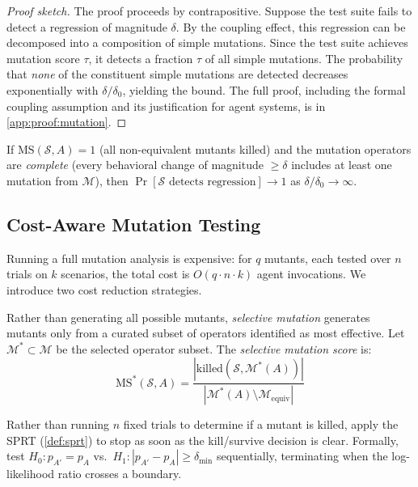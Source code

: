 \begin{proof}[Proof sketch]
The proof proceeds by contrapositive. Suppose the test suite fails to
detect a regression of magnitude $\delta$. By the coupling effect, this
regression can be decomposed into a composition of simple mutations.
Since the test suite achieves mutation score $\tau$, it detects a
fraction $\tau$ of all simple mutations. The probability that \emph{none}
of the constituent simple mutations are detected decreases exponentially
with $\delta / \delta_0$, yielding the bound. The full proof, including
the formal coupling assumption and its justification for agent systems,
is in \cref{app:proof:mutation}.
\end{proof}

\begin{corollary}
\label{cor:mutation-complete}
If $\text{MS}(\mathcal{S}, A) = 1$ (all non-equivalent mutants killed)
and the mutation operators are \emph{complete} (every behavioral change
of magnitude $\geq \delta$ includes at least one mutation from
$\mathcal{M}$), then $\Pr[\mathcal{S} \text{ detects regression}] \to 1$
as $\delta / \delta_0 \to \infty$.
\end{corollary}

\subsection{Cost-Aware Mutation Testing}
\label{sec:mutation:cost}

Running a full mutation analysis is expensive: for $q$ mutants, each
tested over $n$ trials on $k$ scenarios, the total cost is
$O(q \cdot n \cdot k)$ agent invocations. We introduce two cost
reduction strategies.

\begin{definition}
\label{def:selective-mutation}
Rather than generating all possible mutants, \emph{selective mutation}
generates mutants only from a curated subset of operators identified as
most effective. Let $\mathcal{M}^* \subset \mathcal{M}$ be the selected
operator subset. The \emph{selective mutation score} is:
\begin{equation}
\label{eq:selective-ms}
  \text{MS}^*(\mathcal{S}, A) =
    \frac{|\text{killed}(\mathcal{S}, \mathcal{M}^*(A))|}
         {|\mathcal{M}^*(A) \setminus \mathcal{M}_{\text{equiv}}|}
\end{equation}
\end{definition}

\begin{definition}
\label{def:sprt-mutation}
Rather than running $n$ fixed trials to determine if a mutant is killed,
apply the SPRT (\cref{def:sprt}) to stop as soon as the kill/survive
decision is clear. Formally, test $H_0: p_{A'} = p_A$ vs.\
$H_1: |p_{A'} - p_A| \geq \delta_{\min}$ sequentially, terminating when
the log-likelihood ratio crosses a boundary.
\end{definition}

